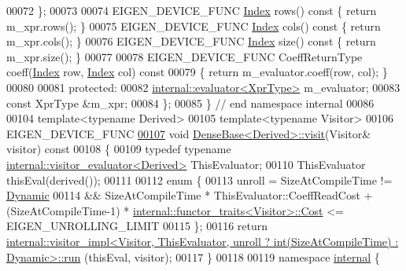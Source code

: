 \begin{DoxyCode}
00072   \};
00073   
00074   EIGEN\_DEVICE\_FUNC \hyperlink{namespace_eigen_a62e77e0933482dafde8fe197d9a2cfde}{Index} rows()\textcolor{keyword}{ const }\{ \textcolor{keywordflow}{return} m\_xpr.rows(); \}
00075   EIGEN\_DEVICE\_FUNC \hyperlink{namespace_eigen_a62e77e0933482dafde8fe197d9a2cfde}{Index} cols()\textcolor{keyword}{ const }\{ \textcolor{keywordflow}{return} m\_xpr.cols(); \}
00076   EIGEN\_DEVICE\_FUNC \hyperlink{namespace_eigen_a62e77e0933482dafde8fe197d9a2cfde}{Index} size()\textcolor{keyword}{ const }\{ \textcolor{keywordflow}{return} m\_xpr.size(); \}
00077 
00078   EIGEN\_DEVICE\_FUNC CoeffReturnType coeff(\hyperlink{namespace_eigen_a62e77e0933482dafde8fe197d9a2cfde}{Index} row, \hyperlink{namespace_eigen_a62e77e0933482dafde8fe197d9a2cfde}{Index} col)\textcolor{keyword}{ const}
00079 \textcolor{keyword}{  }\{ \textcolor{keywordflow}{return} m\_evaluator.coeff(row, col); \}
00080   
00081 \textcolor{keyword}{protected}:
00082   \hyperlink{struct_eigen_1_1internal_1_1evaluator}{internal::evaluator<XprType>} m\_evaluator;
00083   \textcolor{keyword}{const} XprType &m\_xpr;
00084 \};
00085 \} \textcolor{comment}{// end namespace internal}
00086 
00104 \textcolor{keyword}{template}<\textcolor{keyword}{typename} Derived>
00105 \textcolor{keyword}{template}<\textcolor{keyword}{typename} Visitor>
00106 EIGEN\_DEVICE\_FUNC
\hyperlink{group___core___module_a7f73df3954a09c7ab0dca208b6b23ddd}{00107} \textcolor{keywordtype}{void} \hyperlink{group___core___module_a7f73df3954a09c7ab0dca208b6b23ddd}{DenseBase<Derived>::visit}(Visitor& visitor)\textcolor{keyword}{ const}
00108 \textcolor{keyword}{}\{
00109   \textcolor{keyword}{typedef} \textcolor{keyword}{typename} \hyperlink{class_eigen_1_1internal_1_1visitor__evaluator}{internal::visitor\_evaluator<Derived>} ThisEvaluator;
00110   ThisEvaluator thisEval(derived());
00111   
00112   \textcolor{keyword}{enum} \{
00113     unroll =  SizeAtCompileTime != \hyperlink{namespace_eigen_ad81fa7195215a0ce30017dfac309f0b2}{Dynamic}
00114            && SizeAtCompileTime * ThisEvaluator::CoeffReadCost + (SizeAtCompileTime-1) * 
      \hyperlink{struct_eigen_1_1internal_1_1functor__traits}{internal::functor\_traits<Visitor>::Cost} <= EIGEN\_UNROLLING\_LIMIT
00115   \};
00116   \textcolor{keywordflow}{return} 
      \hyperlink{struct_eigen_1_1internal_1_1visitor__impl}{internal::visitor\_impl<Visitor, ThisEvaluator, unroll ? int(SizeAtCompileTime) : Dynamic>::run}
      (thisEval, visitor);
00117 \}
00118 
00119 \textcolor{keyword}{namespace }\hyperlink{namespaceinternal}{internal} \{

\end{DoxyCode}

